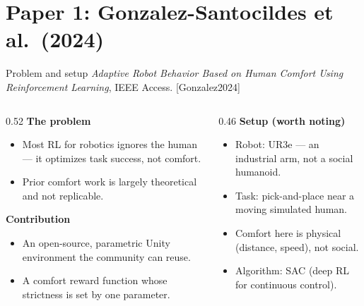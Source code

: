 \documentclass[aspectratio=169,10pt]{beamer}
\newcommand{\refnum}[1]{{\footnotesize\color{giuaccent}[#1]}}
\begin{document}
\section{Paper 1: Gonzalez-Santocildes et al.\ (2024)}

\begin{frame}{Problem and setup}
  \footnotesize \emph{Adaptive Robot Behavior Based on Human Comfort Using Reinforcement Learning}, IEEE Access. \refnum{Gonzalez2024}
  \vspace{0.4em}
  \begin{columns}[T]
    \begin{column}{0.52\textwidth}
      \textbf{The problem}
      \begin{itemize}\footnotesize
        \item Most RL for robotics ignores the human --- it optimizes task success, not comfort.
        \item Prior comfort work is largely theoretical and not replicable.
      \end{itemize}
      \textbf{Contribution}
      \begin{itemize}\footnotesize
        \item An open-source, parametric Unity environment the community can reuse.
        \item A comfort reward function whose strictness is set by one parameter.
      \end{itemize}
    \end{column}
    \begin{column}{0.46\textwidth}
      \textbf{Setup (worth noting)}
      \begin{itemize}\footnotesize
        \item Robot: UR3e --- an industrial arm, not a social humanoid.
        \item Task: pick-and-place near a moving simulated human.
        \item Comfort here is physical (distance, speed), not social.
        \item Algorithm: SAC (deep RL for continuous control).
      \end{itemize}
    \end{column}
  \end{columns}
\end{frame}
\end{document}
